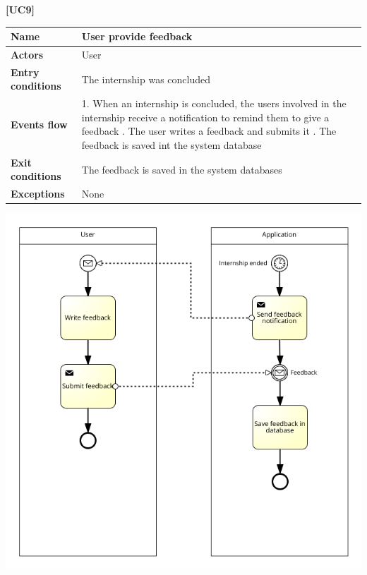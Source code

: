 \documentclass[11pt,twoside]{article}
\begin{document}
\large{\textbf{[UC9]}} \\
\begin{table}[H]
\begin{tabular}{| p{} | p{} |}
\hline
\textbf{Name}
& User provide feedback \\
\hline
\textbf{Actors}
& User \\
\hline
\textbf{Entry conditions}
& The internship was concluded \\
\hline
\textbf{Events flow}
& 1. When an internship is concluded, the users involved in the internship receive a notification to remind them to give a feedback \newline
2. The user writes a feedback and submits it \newline
3. The feedback is saved int the system database \\
\hline
\textbf{Exit conditions}
& The feedback is saved in the system databases \\
\hline
\textbf{Exceptions}
& None \\
\hline
\end{tabular}
\end{table}

\begin{center}
\includegraphics[width=\textwidth]{Images/UC9}
\end{center}
\end{document}
